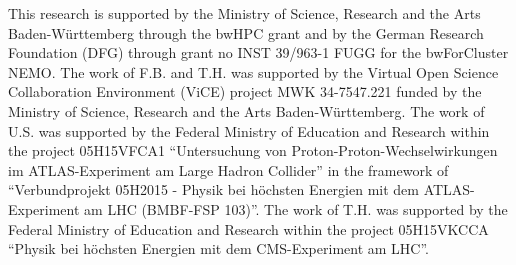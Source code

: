 \begin{acknowledgements}
This research is supported by the Ministry of Science, Research and the Arts Baden-W\"urttemberg through the bwHPC grant
and by the German Research Foundation (DFG) through grant no INST
39/963-1 FUGG for the bwForCluster NEMO.
The work of F.B. and T.H. was supported by the Virtual Open Science
Collaboration Environment (ViCE) project MWK 34-7547.221 funded by the
Ministry of Science, Research and the Arts Baden-W\"urttemberg.
The work of U.S. was supported by  the Federal Ministry of Education
and Research within the project
05H15VFCA1 ``Untersuchung von Proton-Proton-Wechselwirkungen im
ATLAS-Experiment am Large Hadron Collider'' in the framework of ``Verbundprojekt 05H2015 - Physik bei h\"ochsten Energien mit dem ATLAS-Experiment am LHC (BMBF-FSP 103)''.
The work of T.H. was supported by the Federal Ministry of Education
and Research within the project 05H15VKCCA ``Physik bei h\"ochsten Energien mit dem CMS-Experiment
    am LHC''.
\end{acknowledgements}


